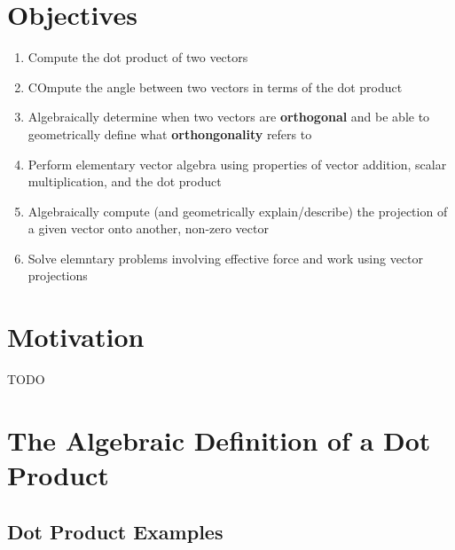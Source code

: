 \documentclass{report}
\begin{document}
\begin{sloppypar}
\section{Objectives}
\begin{enumerate}
  \item Compute the dot product of two vectors
  \item COmpute the angle between two
        vectors in terms of the dot product
  \item Algebraically determine when two vectors
        are \textbf{orthogonal} and be able to
        geometrically define what \textbf{orthongonality}
        refers to
  \item Perform elementary vector algebra using
        properties of vector addition, scalar
        multiplication, and the dot product
  \item Algebraically compute (and geometrically
        explain/describe) the projection of a given
        vector onto another, non-zero vector
  \item Solve elemntary problems involving effective
        force and work using vector projections
\end{enumerate}

\section{Motivation}
TODO


\section{The Algebraic Definition of a
  Dot Product}
\begin{center}
\end{center}


\subsection{Dot Product Examples}





\end{sloppypar}
\end{document}
